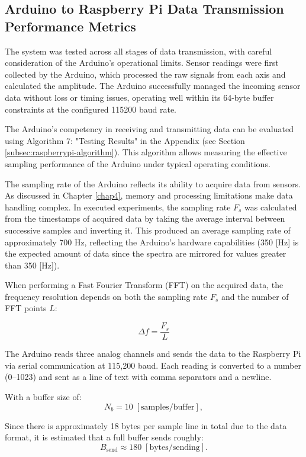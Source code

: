 \subsection{Arduino to Raspberry Pi Data Transmission Performance Metrics}
{
	The system was tested across all stages of data transmission, with careful consideration of the Arduino's operational limits. Sensor readings were first collected by the Arduino, which processed the raw signals from each axis and calculated the amplitude. The Arduino successfully managed the incoming sensor data without loss or timing issues, operating well within its 64-byte buffer constraints at the configured 115200 baud rate.
	
	The Arduino's competency in receiving and transmitting data can be evaluated using Algorithm 7: "Testing Results" in the Appendix (see Section \ref{subsec:raspberrypi-algorithm}). This algorithm allows measuring the effective sampling performance of the Arduino under typical operating conditions.
	
	The sampling rate of the Arduino reflects its ability to acquire data from sensors. As discussed in Chapter \ref{chap4}, memory and processing limitations make data handling complex. In executed experiments, the sampling rate \(F_s\) was calculated from the timestamps of acquired data by taking the average interval between successive samples and inverting it. This produced an average sampling rate of approximately 700 Hz, reflecting the Arduino's hardware capabilities (350 [Hz] is the expected amount of data since the spectra are mirrored for values greater than 350 [Hz]).
	
	When performing a Fast Fourier Transform (FFT) on the acquired data, the frequency resolution depends on both the sampling rate \(F_s\) and the number of FFT points \(L\):
	
	\[
	\Delta f = \frac{F_s}{L}
	\]
	
	The Arduino reads three analog channels and sends the data to the Raspberry Pi via serial communication at 115,200 baud. Each reading is converted to a number (0–1023) and sent as a line of text with comma separators and a newline.
	
	With a buffer size of:
	\[
	N_b = 10 \; [\text{samples/buffer}],
	\]
	
	Since there is approximately 18 bytes per sample line in total due to the data format, it is estimated that a full buffer sends roughly: 
	\[
	B_{\text{send}} \approx 180 \; [\text{bytes/sending}].
	\]
	
}

